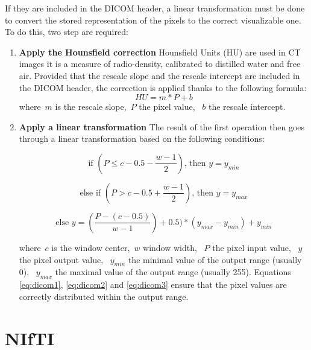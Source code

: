 If they are included in the DICOM header, a linear transformation must be done to convert the stored representation of the pixels to the correct visualizable one. To do this, two step are required: 

\begin{enumerate}
	\item \textbf{Apply the Hounsfield correction}\newline
	Hounsfield Units (HU) are used in CT images it is a measure of radio-density, calibrated to distilled water and free air. Provided that the rescale slope and the rescale intercept are included in the DICOM header, the correction is applied thanks to the following formula:
\begin{equation}
	HU = m * P + b
\end{equation}
	where~$m$ is the rescale slope,~$P$ the pixel value, ~$b$ the rescale intercept.

	\item \textbf{Apply a linear transformation}\newline
	The result of the first operation then goes through a linear transformation based on the following conditions: 

\begin{equation}\label{eq:dicom1}
\textrm{if } (P \leq c - 0.5 - \frac{w-1}{2}) \textrm{, then }y = y_{min}
\end{equation}

\begin{equation}\label{eq:dicom2}
\textrm{else if } (P > c - 0.5 + \frac{w-1}{2}) \textrm{, then }y = y_{max}
\end{equation}

\begin{equation}\label{eq:dicom3}
\textrm{else } y = (\frac{P - (c - 0.5)}{w-1}) + 0.5) * (y_{max} - y_{min}) + y_{min}
\end{equation}

where~$c$ is the window center,~$w$ window width, ~$P$ the pixel input value, ~$y$ the pixel output value, ~$y_{min}$ the minimal value of the output range (usually 0), ~$y_{max}$ the maximal value of the output range (usually 255). Equations \ref{eq:dicom1}, \ref{eq:dicom2} and \ref{eq:dicom3} ensure that the pixel values are correctly distributed within the output range. 

\end{enumerate}


\section{NIfTI}

